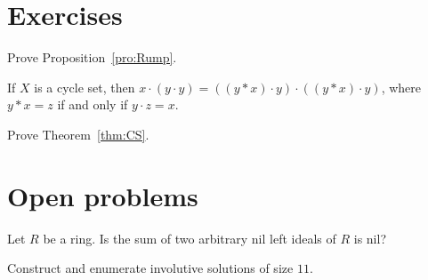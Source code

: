 \section*{Exercises}

\begin{prob}
	\label{prob:Rump}
	Prove Proposition~\ref{pro:Rump}. 
\end{prob}

\begin{prob}
	If $X$ is a cycle set, then $x\cdot (y\cdot y)=((y*x)\cdot y)\cdot ((y*x)\cdot y)$, where
	$y*x=z$ if and only if $y\cdot z=x$. 
\end{prob}

\begin{prob}
	\label{prob:CS}
	Prove Theorem~\ref{thm:CS}. 
\end{prob}

\section*{Open problems}






\begin{problem}[K\"othe]
	\label{prob:Koethe}
	Let $R$ be a ring. Is the sum 
	of two arbitrary nil left ideals of $R$ is nil?
\end{problem}

\begin{problem}
	Construct and enumerate involutive solutions of size $11$. 
\end{problem}


